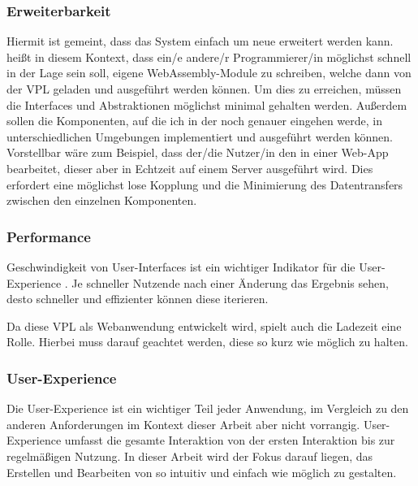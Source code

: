 \documentclass[ngerman]{article}
\begin{document}
\subsubsection{Erweiterbarkeit}

Hiermit ist gemeint, dass das System einfach um neue  erweitert werden kann.
 heißt in diesem Kontext, dass ein/e andere/r Programmierer/in möglichst 
schnell in der Lage sein soll, eigene WebAssembly-Module zu schreiben, welche dann von der VPL geladen und ausgeführt werden können.
Um dies zu erreichen, müssen die Interfaces und Abstraktionen möglichst minimal gehalten werden.
\br
Außerdem sollen die Komponenten, auf die ich in der  noch genauer eingehen werde, in unterschiedlichen Umgebungen implementiert und ausgeführt werden können.
Vorstellbar wäre zum Beispiel, dass der/die Nutzer/in den  in einer Web-App bearbeitet, dieser aber in Echtzeit auf einem Server ausgeführt wird. 
Dies erfordert eine möglichst lose Kopplung und die Minimierung des Datentransfers zwischen den einzelnen Komponenten.

\subsubsection{Performance}

Geschwindigkeit von User-Interfaces ist ein wichtiger Indikator für die User-Experience \cite{6876022}. 
Je schneller Nutzende nach einer Änderung das Ergebnis sehen, desto schneller und effizienter können diese iterieren. 

Da diese VPL als Webanwendung entwickelt wird, spielt auch die Ladezeit eine Rolle. 
Hierbei muss darauf geachtet werden, diese so kurz wie möglich zu halten.

\subsubsection{User-Experience}

Die User-Experience ist ein wichtiger Teil jeder Anwendung, im Vergleich zu den anderen Anforderungen im Kontext dieser Arbeit aber nicht vorrangig. User-Experience umfasst die gesamte Interaktion von der ersten Interaktion bis zur regelmäßigen Nutzung. In dieser Arbeit wird der Fokus darauf liegen, das Erstellen und Bearbeiten von  so intuitiv und einfach wie möglich zu gestalten.
\end{document}
